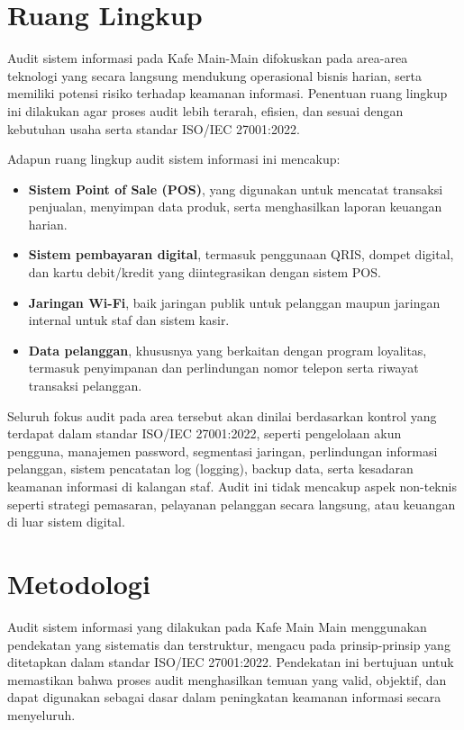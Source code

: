 \documentclass[12pt, a4paper]{report}
\begin{document}
\section{Ruang Lingkup}

Audit sistem informasi pada Kafe Main-Main difokuskan pada area-area teknologi yang secara langsung mendukung operasional bisnis harian, serta memiliki potensi risiko terhadap keamanan informasi. Penentuan ruang lingkup ini dilakukan agar proses audit lebih terarah, efisien, dan sesuai dengan kebutuhan usaha serta standar ISO/IEC 27001:2022.

Adapun ruang lingkup audit sistem informasi ini mencakup:

\begin{itemize}
    \item \textbf{Sistem Point of Sale (POS)}, yang digunakan untuk mencatat transaksi penjualan, menyimpan data produk, serta menghasilkan laporan keuangan harian.

    \item \textbf{Sistem pembayaran digital}, termasuk penggunaan QRIS, dompet digital, dan kartu debit/kredit yang diintegrasikan dengan sistem POS.

    \item \textbf{Jaringan Wi-Fi}, baik jaringan publik untuk pelanggan maupun jaringan internal untuk staf dan sistem kasir.

    \item \textbf{Data pelanggan}, khususnya yang berkaitan dengan program loyalitas, termasuk penyimpanan dan perlindungan nomor telepon serta riwayat transaksi pelanggan.
\end{itemize}

Seluruh fokus audit pada area tersebut akan dinilai berdasarkan kontrol yang terdapat dalam standar ISO/IEC 27001:2022, seperti pengelolaan akun pengguna, manajemen password, segmentasi jaringan, perlindungan informasi pelanggan, sistem pencatatan log (logging), backup data, serta kesadaran keamanan informasi di kalangan staf. Audit ini tidak mencakup aspek non-teknis seperti strategi pemasaran, pelayanan pelanggan secara langsung, atau keuangan di luar sistem digital.

\section{Metodologi}
\label{sec:metodologi}

Audit sistem informasi yang dilakukan pada Kafe Main Main menggunakan pendekatan yang sistematis dan terstruktur, mengacu pada prinsip-prinsip yang ditetapkan dalam standar ISO/IEC 27001:2022. Pendekatan ini bertujuan untuk memastikan bahwa proses audit menghasilkan temuan yang valid, objektif, dan dapat digunakan sebagai dasar dalam peningkatan keamanan informasi secara menyeluruh.
\end{document}
